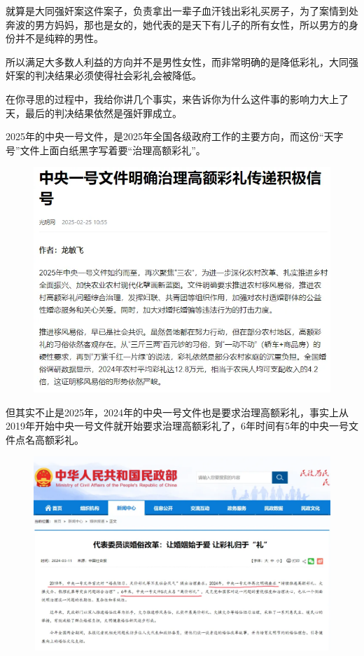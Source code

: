 \documentclass[UTF8,11pt,oneside]{ctexart}
\begin{document}
就算是大同强奸案这件案子，负责拿出一辈子血汗钱出彩礼买房子，为了案情到处奔波的男方妈妈，那也是女的，她代表的是天下有儿子的所有女性，所以男方的身份并不是纯粹的男性。

所以满足大多数人利益的方向并不是男性女性，而非常明确的是降低彩礼，大同强奸案的判决结果必须使得社会彩礼会被降低。



在你寻思的过程中，我给你讲几个事实，来告诉你为什么这件事的影响力大上了天，最后的判决结果依然是强奸罪成立。

2025年的中央一号文件，是2025年全国各级政府工作的主要方向，而这份“天字号”文件上面白纸黑字写着要“治理高额彩礼”。

\begin{figure}[H]
    \centering
    \includegraphics[width=13cm]{2025-04-17-002.png}
\end{figure}

但其实不止是2025年，2024年的中央一号文件也是要求治理高额彩礼，事实上从2019年开始中央一号文件就开始要求治理高额彩礼了，6年时间有5年的中央一号文件点名高额彩礼。

\begin{figure}[H]
    \centering
    \includegraphics[width=13cm]{2025-04-17-003.png}
\end{figure}
\end{document}
